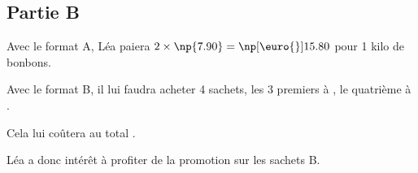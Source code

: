 \subsection*{Partie B}

	Avec le format A, Léa paiera {$2\times\np{7.90}=\np[\euro{}]{15.80}$} pour 1 kilo de bonbons.

	Avec le format B, il lui faudra acheter 4 sachets, les 3 premiers à , le quatrième à .

	Cela lui coûtera au total .

	Léa a donc intérêt à profiter de la promotion sur les sachets B.

